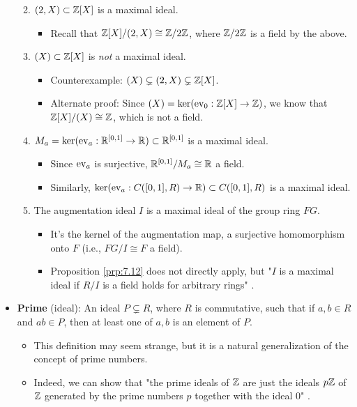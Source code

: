 \documentclass[../notes.tex]{subfiles}
\begin{document}
\begin{itemize}
\begin{enumerate}
\begin{itemize}
        \end{itemize}
        \item $(2,X)\subset\mathbb{Z}[X]$ is a maximal ideal.
        \begin{itemize}
            \item Recall that $\mathbb{Z}[X]/(2,X)\cong\mathbb{Z}/2\mathbb{Z}$, where $\mathbb{Z}/2\mathbb{Z}$ is a field by the above.
        \end{itemize}
        \item $(X)\subset\mathbb{Z}[X]$ is \emph{not} a maximal ideal.
        \begin{itemize}
            \item Counterexample: $(X)\subsetneq(2,X)\subsetneq\mathbb{Z}[X]$.
            \item Alternate proof: Since $(X)=\ker(\operatorname{ev}_0:\mathbb{Z}[X]\to\mathbb{Z})$, we know that $\mathbb{Z}[X]/(X)\cong\mathbb{Z}$, which is not a field.
        \end{itemize}
        \item $M_a=\ker(\operatorname{ev}_a:\mathbb{R}^{[0,1]}\to\mathbb{R})\subset\mathbb{R}^{[0,1]}$ is a maximal ideal.
        \begin{itemize}
            \item Since $\operatorname{ev}_a$ is surjective, $\mathbb{R}^{[0,1]}/M_a\cong\mathbb{R}$ a field.
            \item Similarly, $\ker(\operatorname{ev}_a:C([0,1],R)\to\mathbb{R})\subset C([0,1],R)$ is a maximal ideal.
        \end{itemize}
        \item The augmentation ideal $I$ is a maximal ideal of the group ring $FG$.
        \begin{itemize}
            \item It's the kernel of the augmentation map, a surjective homomorphism onto $F$ (i.e., $FG/I\cong F$ a field).
            \item Proposition \ref{prp:7.12} does not directly apply, but "$I$ is a maximal ideal if $R/I$ is a field holds for arbitrary rings" \parencite[255]{bib:DummitFoote}.
        \end{itemize}
    \end{enumerate}
    \item \textbf{Prime} (ideal): An ideal $P\subsetneq R$, where $R$ is commutative, such that if $a,b\in R$ and $ab\in P$, then at least one of $a,b$ is an element of $P$.
    \begin{itemize}
        \item This definition may seem strange, but it is a natural generalization of the concept of prime numbers.
        \item Indeed, we can show that "the prime ideals of $\mathbb{Z}$ are just the ideals $p\mathbb{Z}$ of $\mathbb{Z}$ generated by the prime numbers $p$ together with the ideal 0" \parencite[255]{bib:DummitFoote}.

\end{itemize}
\end{itemize}
\end{document}
